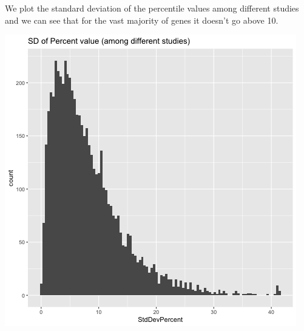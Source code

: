 \documentclass[11pt]{article}
\begin{document}
We plot the standard deviation of the percentile values among different studies and we can see that for the vast majority of genes it doesn't go above 10.
\begin{center}
\includegraphics[width=.9\linewidth]{./Plots/rnaseq_perc_sd.png}
\end{center}
\end{document}
